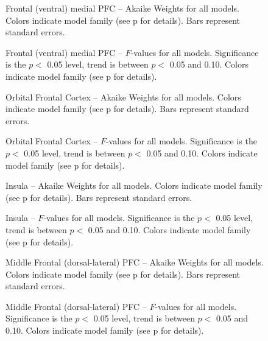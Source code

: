 \documentclass[doc,12pt]{apa}        %
\begin{document}
\begin{figure}[tp]
    \centering
    \caption{Frontal (ventral) medial PFC -- Akaike Weights for all models.  Colors indicate model family (see p\pageref{sub:cmb} for details). Bars represent standard errors.}
	\label{fig:vmpfc}
\end{figure}
\begin{figure}[tp]
    \centering
    \caption{Frontal (ventral) medial PFC -- $F$-values for all models.  Significance is the $p <$ 0.05 level, trend is between $p <$ 0.05 and 0.10.  Colors indicate model family (see p\pageref{sub:cmb} for details).}
	\label{fig:fvalvmpfc}
\end{figure}


\begin{figure}[tp]
    \centering
    \caption{Orbital Frontal Cortex -- Akaike Weights for all models.  Colors indicate model family (see p\pageref{sub:cmb} for details). Bars represent standard errors.}
	\label{fig:ofc}
\end{figure}
\begin{figure}[tp]
    \centering
    \caption{Orbital Frontal Cortex -- $F$-values for all models.  Significance is the $p <$ 0.05 level, trend is between $p <$ 0.05 and 0.10.  Colors indicate model family (see p\pageref{sub:cmb} for details).}
	\label{fig:fvalofc}
\end{figure}


\begin{figure}[tp]
    \centering
    \caption{Insula -- Akaike Weights for all models.  Colors indicate model family (see p\pageref{sub:cmb} for details). Bars represent standard errors.}
	\label{fig:insula}
\end{figure}
\begin{figure}[tp]
    \centering
    \caption{Insula -- $F$-values for all models.  Significance is the $p <$ 0.05 level, trend is between $p <$ 0.05 and 0.10.  Colors indicate model family (see p\pageref{sub:cmb} for details).}
	\label{fig:fvalinsula}
\end{figure}


\begin{figure}[tp]
    \centering
    \caption{Middle Frontal (dorsal-lateral) PFC -- Akaike Weights for all models.  Colors indicate model family (see p\pageref{sub:cmb} for details). Bars represent standard errors.}
	\label{fig:dlpfc}
\end{figure}
\begin{figure}[tp]
    \centering
    \caption{Middle Frontal (dorsal-lateral) PFC -- $F$-values for all models.  Significance is the $p <$ 0.05 level, trend is between $p <$ 0.05 and 0.10.  Colors indicate model family (see p\pageref{sub:cmb} for details).}
	\label{fig:fvaldlpfc}
\end{figure}

\clearpage
\newpage

\end{document}
